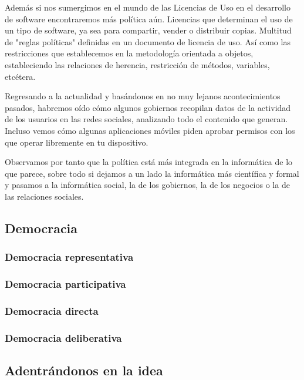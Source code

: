 Además si nos sumergimos en el mundo de las Licencias de Uso en el desarrollo de software encontraremos más política aún. Licencias que determinan el uso de un tipo de software, ya sea para compartir, vender o distribuir copias. Multitud de "reglas políticas" definidas en un documento de licencia de uso. Así como las restricciones que establecemos en la metodología orientada a objetos, estableciendo las relaciones de herencia, restricción de métodos, variables, etcétera.

Regresando a la actualidad y basándonos en no muy lejanos acontecimientos pasados, habremos oído cómo algunos gobiernos recopilan datos de la actividad de los usuarios en las redes sociales, analizando todo el contenido que generan. Incluso vemos cómo algunas aplicaciones móviles piden aprobar permisos con los que operar libremente en tu dispositivo.

Observamos por tanto que la política está más integrada en la informática de lo que parece, sobre todo si dejamos a un lado la informática más científica y formal y pasamos a la informática social, la de los gobiernos, la de los negocios o la de las relaciones sociales.

\subsection{Democracia}

\subsubsection{Democracia representativa}

\subsubsection{Democracia participativa}

\subsubsection{Democracia directa}

\subsubsection{Democracia deliberativa}


\subsection{Adentrándonos en la idea}


